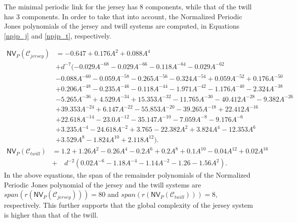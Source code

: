 \documentclass{article}
\begin{document}
The minimal periodic link for the jersey has 8 components, while that of the twill has 3 components. In order to take that into account, the Normalized Periodic Jones polynomials of the jersey and twill systems are computed, in Equations \ref{npjp_j} and \ref{npjp_t}, respectively.

\begin{equation}\displaystyle
\begin{split}
    \mathsf{NV}_P(\mathcal{C}_{jersey}) &= -0.647+0.176A^{2}+0.088A^{4}\\
    & +
    {d}^{-7} (-0.029A^{-68}-0.029A^{-66}-0.118A^{-64}-0.029A^{-62}\\&-0.088A^{-60}-0.059A^{-58}-0.265A^{-56}-0.324A^{-54}+0.059A^{-52}+0.176A^{-50}\\&+0.206A^{-48}-0.235A^{-46}-0.118A^{-44}-1.971A^{-42}-1.176A^{-40}-2.324A^{-38}\\&-5.265A^{-36}+4.529A^{-34}+15.353A^{-32}-11.765A^{-30}-40.412A^{-28}-9.382A^{-26}\\&+39.353A^{-24}+6.147A^{-22}-55.853A^{-20}-39.265A^{-18}+22.412A^{-16}\\&+22.618A^{-14}-23.0A^{-12}-35.147A^{-10}-7.059A^{-8}-9.176A^{-6}\\&+3.235A^{-4}-24.618A^{-2}+3.765-22.382A^{2}+3.824A^{4}-12.353A^{6}\\&+3.529A^{8}-1.824A^{10}+2.118A^{12}).
\end{split}    
\label{npjp_j}
\end{equation}
\begin{equation}\displaystyle
\begin{split}
    \mathsf{NV}_P(\mathcal{C}_{twill}) &= 1.2+1.26A^{2}-0.26A^{4}-0.2A^{6}+0.2A^{8}+0.1A^{10}-0.04A^{12}+0.02A^{16}\\
    & + \quad {d}^{-2} (0.02A^{-6}-1.18A^{-4}-1.14A^{-2}-1.26-1.56A^{2}).
\end{split}        
    \label{npjp_t}
\end{equation}
In the above equations, the span of the remainder polynomials of the Normalized Periodic Jones polynomial of the jersey and the twill systems are $span(r(\mathsf{NV}_P(\mathcal{C}_{jersey})))=80$ and $span(r(\mathsf{NV}_P(\mathcal{C}_{twill})))=8$, respectively. This further supports that the global complexity of the jersey system is higher than that of the twill.
\end{document}
